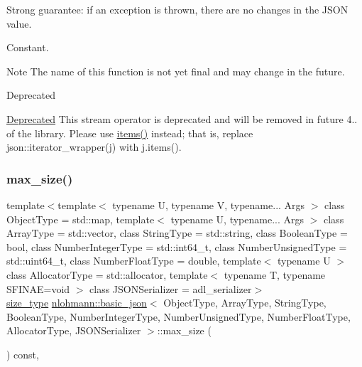 Strong guarantee\+: if an exception is thrown, there are no changes in the J\+S\+ON value.

Constant.

\begin{DoxyNote}{Note}
The name of this function is not yet final and may change in the future.
\end{DoxyNote}
\begin{DoxyRefDesc}{Deprecated}
\item[\mbox{\hyperlink{deprecated__deprecated000001}{Deprecated}}]This stream operator is deprecated and will be removed in future 4.. of the library. Please use \mbox{\hyperlink{classnlohmann_1_1basic__json_afe3e137ace692efa08590d8df40f58dd}{items()}} instead; that is, replace {\ttfamily json\+::iterator\+\_\+wrapper(j)} with {\ttfamily j.\+items()}. \end{DoxyRefDesc}
\mbox{\label{classnlohmann_1_1basic__json_a2f47d3c6a441c57dd2be00449fbb88e1}} 
\subsubsection{\texorpdfstring{max\+\_\+size()}{max\_size()}}
{\footnotesize\ttfamily template$<$template$<$ typename U, typename V, typename... Args $>$ class Object\+Type = std\+::map, template$<$ typename U, typename... Args $>$ class Array\+Type = std\+::vector, class String\+Type  = std\+::string, class Boolean\+Type  = bool, class Number\+Integer\+Type  = std\+::int64\+\_\+t, class Number\+Unsigned\+Type  = std\+::uint64\+\_\+t, class Number\+Float\+Type  = double, template$<$ typename U $>$ class Allocator\+Type = std\+::allocator, template$<$ typename T, typename S\+F\+I\+N\+A\+E=void $>$ class J\+S\+O\+N\+Serializer = adl\+\_\+serializer$>$ \\
\mbox{\hyperlink{classnlohmann_1_1basic__json_a39f2cd0b58106097e0e67bf185cc519b}{size\+\_\+type}} \mbox{\hyperlink{classnlohmann_1_1basic__json}{nlohmann\+::basic\+\_\+json}}$<$ Object\+Type, Array\+Type, String\+Type, Boolean\+Type, Number\+Integer\+Type, Number\+Unsigned\+Type, Number\+Float\+Type, Allocator\+Type, J\+S\+O\+N\+Serializer $>$\+::max\+\_\+size (\begin{DoxyParamCaption}{ }\end{DoxyParamCaption}) const\hspace{0.3cm}{\ttfamily [inline]}, {\ttfamily [noexcept]}}



